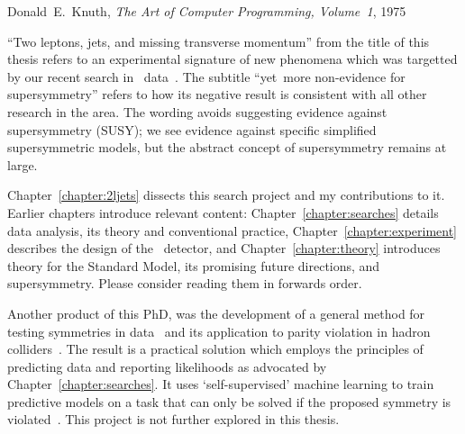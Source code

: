 \begin{preface}
\begin{singlespacing}
\begin{epigraphs}
%
{Donald~E.~Knuth,
\textit{The Art of Computer Programming, Volume~1},
1975~\cite{knuth1975art}}
\end{epigraphs}
\end{singlespacing}
\noindent
``Two leptons, jets, and missing transverse momentum'' from the title of this
thesis refers to an experimental signature of new phenomena which was targetted
by our recent search in \atlas\ data~\cite{atlas2022searches}.
The subtitle ``yet~more non-evidence for supersymmetry'' refers to how its
negative result is consistent with all other research in the area.
The wording avoids suggesting evidence against supersymmetry (SUSY);
we see evidence against specific simplified supersymmetric models, but the
abstract concept of supersymmetry remains at large.

Chapter~\ref{chapter:2ljets} dissects this search project and my contributions
to it.
Earlier chapters introduce relevant content:
Chapter~\ref{chapter:searches} details data analysis,
its theory and conventional practice,
Chapter~\ref{chapter:experiment} describes the design of the \atlas\ detector,
and
Chapter~\ref{chapter:theory} introduces theory for the Standard Model, its
promising future directions, and supersymmetry.
Please consider reading them in forwards order.

Another product of this PhD,
was the development of a general method for testing symmetries in data~\cite{
lester2021stressed,
tombs2021which
}
and its application to parity violation in hadron colliders~\cite{
lester2022hunting,
Lester:2019bso,
lesterChiralMeasurements2021,
Gripaios:2020hya,
lester2021lorentz
}.
The result is a practical solution which employs the principles of predicting
data and reporting likelihoods as advocated by Chapter~\ref{chapter:searches}.
It uses `self-supervised' machine learning to train predictive models on a
task that can only be solved if the proposed symmetry is violated~\cite{
tombs2021which,
pmlr-v139-radford21a,
Noroozi2016jigsaw,
multitaskself2017,
devlin2019bert
}.
This project is not further explored in this thesis.
\end{preface}

\tableofcontents

\thispagestyle{empty}
